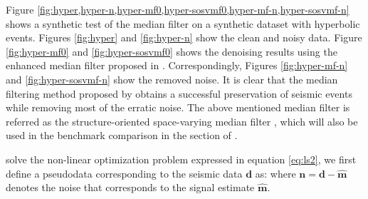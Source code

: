 Figure \ref{fig:hyper,hyper-n,hyper-mf0,hyper-sosvmf0,hyper-mf-n,hyper-sosvmf-n} shows a synthetic test of the  median filter on a synthetic dataset with hyperbolic events. 
Figures \ref{fig:hyper} and \ref{fig:hyper-n} show the clean and noisy data. Figure \ref{fig:hyper-mf0} and \ref{fig:hyper-sosvmf0} shows the denoising results using the enhanced median filter proposed in \cite{sosvmf}. Correspondingly, Figures \ref{fig:hyper-mf-n} and \ref{fig:hyper-sosvmf-n} show the removed noise. It is clear that the median filtering method proposed by \cite{sosvmf} obtains a successful preservation of seismic events while removing most of the erratic noise. The above mentioned median filter is referred as the structure-oriented space-varying median filter \cite[]{sosvmf}, which will also be used in the benchmark comparison in the section of . 


 solve the non-linear optimization problem expressed in equation \ref{eq:ls2}, we first define a pseudodata corresponding to the seismic data $\mathbf{d}$ as:
where $\mathbf{n}=\mathbf{d}-\hat{\mathbf{m}}$ denotes the noise that corresponds to the signal estimate $\hat{\mathbf{m}}$. 

